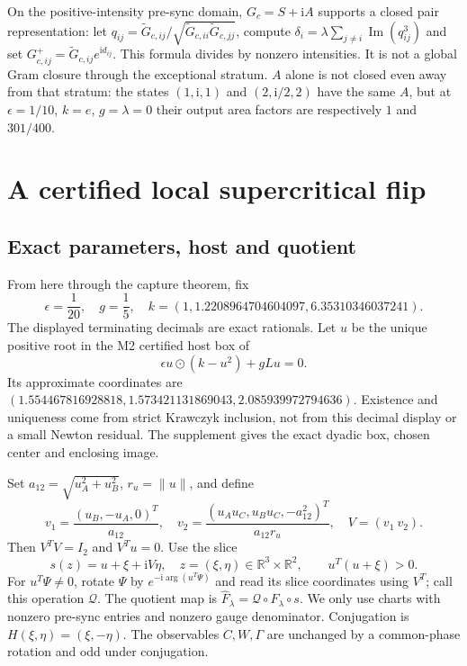 \documentclass[11pt,a4paper]{article}
\newcommand{\R}{\mathbb R}\newcommand{\C}{\mathbb C}\newcommand{\Om}{\Omega}\newcommand{\Fh}{\widehat F}\newcommand{\cof}{\operatorname{cof}}\newcommand{\diag}{\operatorname{diag}}\newcommand{\Argz}{\operatorname{Arg}_0}\newcommand{\iu}{\mathrm i}\newcommand{\dd}{\mathrm d}
\begin{document}
On the positive-intensity pre-sync domain, $G_c=S+\iu A$ supports a closed pair representation: let $q_{ij}=\widetilde G_{c,ij}/\sqrt{\widetilde G_{c,ii}\widetilde G_{c,jj}}$, compute $\delta_i=\lambda\sum_{j\ne i}\operatorname{Im}(q_{ij}^3)$ and set $G_{c,ij}^+=\widetilde G_{c,ij}e^{\iu d_{ij}}$. This formula divides by nonzero intensities. It is not a global Gram closure through the exceptional stratum. $A$ alone is not closed even away from that stratum: the states $(1,\iu,1)$ and $(2,\iu/2,2)$ have the same $A$, but at $\epsilon=1/10$, $k=e$, $g=\lambda=0$ their output area factors are respectively $1$ and $301/400$.

\section{A certified local supercritical flip}
\subsection{Exact parameters, host and quotient}
From here through the capture theorem, fix
\begin{equation}
 \epsilon=\frac1{20},\quad g=\frac15,\quad
 k=(1,1.2208964704604097,6.35310346037241).\label{eq:params}
\end{equation}
The displayed terminating decimals are exact rationals. Let $u$ be the unique positive root in the M2 certified host box of
\begin{equation}
 \epsilon u\odot(k-u^2)+gLu=0.
\end{equation}
Its approximate coordinates are $(1.554467816928818,1.573421131869043,2.085939972794636)$. Existence and uniqueness come from strict Krawczyk inclusion, not from this decimal display or a small Newton residual. The supplement gives the exact dyadic box, chosen center and enclosing image.

Set $a_{12}=\sqrt{u_A^2+u_B^2}$, $r_u=\|u\|$, and define
\begin{equation}
 v_1=\frac{(u_B,-u_A,0)^T}{a_{12}},\quad
 v_2=\frac{(u_Au_C,u_Bu_C,-a_{12}^2)^T}{a_{12}r_u},\quad V=(v_1\ v_2).
\end{equation}
Then $V^TV=I_2$ and $V^Tu=0$. Use the slice
\begin{equation}
 s(z)=u+\xi+\iu V\eta,\quad z=(\xi,\eta)\in\R^3\times\R^2,\qquad u^T(u+\xi)>0.
\end{equation}
For $u^T\Psi\ne0$, rotate $\Psi$ by $e^{-\iu\arg(u^T\Psi)}$ and read its slice coordinates using $V^T$; call this operation $\mathcal Q$. The quotient map is $\Fh_\lambda=\mathcal Q\circ F_\lambda\circ s$. We only use charts with nonzero pre-sync entries and nonzero gauge denominator. Conjugation is $H(\xi,\eta)=(\xi,-\eta)$. The observables $C,W,\Gamma$ are unchanged by a common-phase rotation and odd under conjugation.
\end{document}
